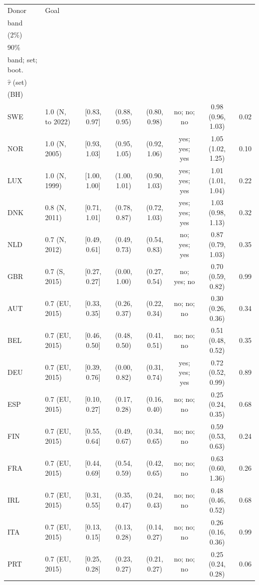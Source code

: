 \begin{tabular}{llcccccc}\toprule
Donor & Goal & \hd{Revealed\\band} & \hd{$\tau$ set\\(2\%)} & \hd{Bootstrap\\90\%} & \hd{Goal in\\band; set; boot.} & \hd{GNI-adjusted\\$\hat\tau$ (set)} & \hd{Both tests\\(BH)}\\\midrule
SWE & 1.0 (N, to 2022) & [0.83, 0.97] & (0.88, 0.95) & (0.80, 0.98) & no; no; no & 0.98 (0.96, 1.03) & 0.02\\
NOR & 1.0 (N, 2005) & [0.93, 1.03] & (0.95, 1.05) & (0.92, 1.06) & yes; yes; yes & 1.05 (1.02, 1.25) & 0.10\\
LUX & 1.0 (N, 1999) & [1.00, 1.00] & (1.00, 1.01) & (0.90, 1.03) & yes; yes; yes & 1.01 (1.01, 1.04) & 0.22\\
DNK & 0.8 (N, 2011) & [0.71, 1.01] & (0.78, 0.87) & (0.72, 1.03) & yes; yes; yes & 1.03 (0.98, 1.13) & 0.32\\
NLD & 0.7 (N, 2012) & [0.49, 0.61] & (0.49, 0.73) & (0.54, 0.83) & no; yes; yes & 0.87 (0.79, 1.03) & 0.35\\
GBR & 0.7 (S, 2015) & [0.27, 0.27] & (0.00, 1.00) & (0.27, 0.54) & no; yes; no & 0.70 (0.59, 0.82) & 0.99\\
AUT & 0.7 (EU, 2015) & [0.33, 0.35] & (0.26, 0.37) & (0.22, 0.34) & no; no; no & 0.30 (0.26, 0.36) & 0.34\\
BEL & 0.7 (EU, 2015) & [0.46, 0.50] & (0.48, 0.50) & (0.41, 0.51) & no; no; no & 0.51 (0.48, 0.52) & 0.35\\
DEU & 0.7 (EU, 2015) & [0.39, 0.76] & (0.00, 0.82) & (0.31, 0.74) & yes; yes; yes & 0.72 (0.52, 0.99) & 0.89\\
ESP & 0.7 (EU, 2015) & [0.10, 0.27] & (0.17, 0.28) & (0.16, 0.40) & no; no; no & 0.25 (0.24, 0.35) & 0.68\\
FIN & 0.7 (EU, 2015) & [0.55, 0.64] & (0.49, 0.67) & (0.34, 0.65) & no; no; no & 0.59 (0.53, 0.63) & 0.24\\
FRA & 0.7 (EU, 2015) & [0.44, 0.69] & (0.54, 0.59) & (0.42, 0.65) & no; no; no & 0.63 (0.60, 1.36) & 0.26\\
IRL & 0.7 (EU, 2015) & [0.31, 0.55] & (0.35, 0.47) & (0.24, 0.43) & no; no; no & 0.48 (0.46, 0.52) & 0.68\\
ITA & 0.7 (EU, 2015) & [0.13, 0.15] & (0.13, 0.28) & (0.14, 0.27) & no; no; no & 0.26 (0.16, 0.36) & 0.99\\
PRT & 0.7 (EU, 2015) & [0.25, 0.28] & (0.23, 0.27) & (0.21, 0.27) & no; no; no & 0.25 (0.24, 0.28) & 0.06\\
\bottomrule\end{tabular}